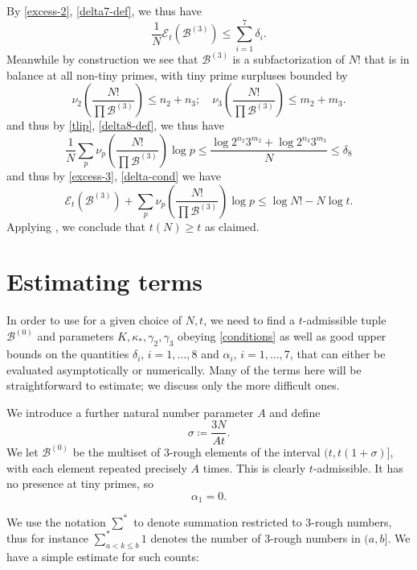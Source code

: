 \documentclass[12pt,a4paper,reqno]{amsart}
\numberwithin{equation}{section}
\theoremstyle{plain}
\theoremstyle{definition}
\newcommand\tuple{{\mathcal B}}
\newcommand\excess{{\mathcal{E}}}
\begin{document}
By \eqref{excess-2}, \eqref{delta7-def}, we thus have
\begin{equation}\label{excess-3}
 \frac{1}{N} \excess_t(\tuple^{(3)}) \leq \sum_{i=1}^7 \delta_i.
\end{equation}
Meanwhile by construction we see that $\tuple^{(3)}$ is a subfactorization of $N!$ that is in balance at all non-tiny primes, with tiny prime surpluses bounded by
$$ \nu_2\left( \frac{N!}{\prod \tuple^{(3)}}\right) \leq n_2+n_3; \quad \nu_3\left( \frac{N!}{\prod \tuple^{(3)}}\right) \leq m_2+m_3.$$
and thus by \eqref{tlip}, \eqref{delta8-def}, we thus have
$$ \frac{1}{N} \sum_p \nu_p\left( \frac{N!}{\prod \tuple^{(3)}}\right) \log p \leq \frac{\log 2^{n_2} 3^{m_2} + \log 2^{n_3} 3^{m_3}}{N} \leq \delta_8$$
and thus by \eqref{excess-3}, \eqref{delta-cond} we have
$$ \excess_t(\tuple^{(3)}) + \sum_p \nu_p\left( \frac{N!}{\prod \tuple^{(3)}}\right) \log p \leq \log N! - N \log t.$$
Applying , we conclude that $t(N) \geq t$ as claimed.

\section{Estimating terms}\label{construction-sec}

In order to use  for a given choice of $N,t$, we need to find a $t$-admissible tuple $\tuple^{(0)}$ and parameters $K, \kappa_*, \gamma_2, \gamma_3$ obeying \eqref{conditions} as well as good upper bounds on the quantities $\delta_i$, $i=1,\dots,8$ and $\alpha_i$, $i=1,\dots,7$, that can either be evaluated asymptotically or numerically.  Many of the terms here will be straightforward to estimate; we discuss only the more difficult ones.

We introduce a further natural number parameter $A$ and define 
\begin{equation}\label{sigma-def}
  \sigma \coloneqq \frac{3N}{At}.
\end{equation}
We let $\tuple^{(0)}$ be the multiset of $3$-rough elements of the interval $(t, t(1+\sigma)]$, with each element repeated precisely $A$ times.  This is clearly $t$-admissible.  It has no presence at tiny primes, so
\begin{equation}\label{alpha1-vanish}
  \alpha_1 = 0.
\end{equation}

We use the notation $\sum^*$ to denote summation restricted to $3$-rough numbers, thus for instance $\sum_{a < k \leq b}^* 1$ denotes the number of $3$-rough numbers in $(a,b]$.  We have a simple estimate for such counts:
\end{document}

